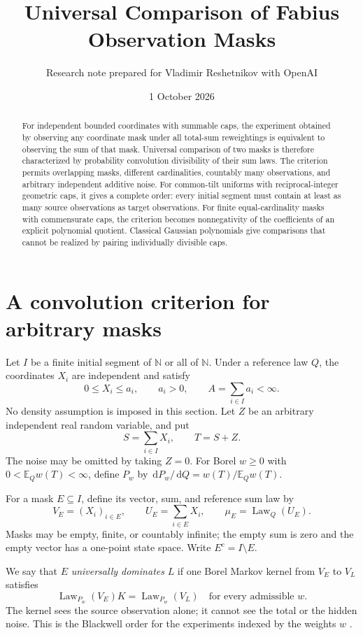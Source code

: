 \documentclass[11pt,a4paper]{article}
\title{Universal Comparison of Fabius Observation Masks}
\author{Research note prepared for Vladimir Reshetnikov with OpenAI}
\date{1 October 2026}
\theoremstyle{remark}\newtheorem*{ednote}{Editorial note (ProveIt, 2026-10-01)}
\newcommand{\E}{\mathbb E}\newcommand{\R}{\mathbb R}\newcommand{\C}{\mathbb C}\newcommand{\N}{\mathbb N}
\newcommand{\Law}{\operatorname{Law}}\newcommand{\ind}{\mathbf1}
\newcommand{\dd}{\,\mathrm d}\newcommand{\ii}{\mathrm i}
\begin{document}
\maketitle
\begin{abstract}
For independent bounded coordinates with summable caps, the experiment obtained by observing any coordinate mask under all total-sum reweightings is equivalent to observing the sum of that mask. Universal comparison of two masks is therefore characterized by probability convolution divisibility of their sum laws. The criterion permits overlapping masks, different cardinalities, countably many observations, and arbitrary independent additive noise. For common-tilt uniforms with reciprocal-integer geometric caps, it gives a complete order: every initial segment must contain at least as many source observations as target observations. For finite equal-cardinality masks with commensurate caps, the criterion becomes nonnegativity of the coefficients of an explicit polynomial quotient. Classical Gaussian polynomials give comparisons that cannot be realized by pairing individually divisible caps.
\end{abstract}

\section{A convolution criterion for arbitrary masks}
Let $I$ be a finite initial segment of $\N$ or all of $\N$. Under a reference law $Q$, the coordinates $X_i$ are independent and satisfy
\[
 0\le X_i\le a_i,\qquad a_i>0,\qquad A=\sum_{i\in I}a_i<\infty.
\]
No density assumption is imposed in this section. Let $Z$ be an arbitrary independent real random variable, and put
\[
 S=\sum_{i\in I}X_i,\qquad T=S+Z.
\]
The noise may be omitted by taking $Z=0$. For Borel $w\ge0$ with $0<\E_Qw(T)<\infty$, define $P_w$ by $\dd P_w/\dd Q=w(T)/\E_Qw(T)$.

For a mask $E\subseteq I$, define its vector, sum, and reference sum law by
\[
 V_E=(X_i)_{i\in E},\qquad U_E=\sum_{i\in E}X_i,
 \qquad \mu_E=\Law_Q(U_E).
\]
Masks may be empty, finite, or countably infinite; the empty sum is zero and the empty vector has a one-point state space. Write $E^c=I\setminus E$.

We say that $E$ \emph{universally dominates} $L$ if one Borel Markov kernel from $V_E$ to $V_L$ satisfies
\begin{equation}\label{eq:dominance}
 \Law_{P_w}(V_E)K=\Law_{P_w}(V_L)
 \quad\text{for every admissible }w.
\end{equation}
The kernel sees the source observation alone; it cannot see the total or the hidden noise. This is the Blackwell order for the experiments indexed by the weights $w$ \cite{Blackwell}.
\end{document}
